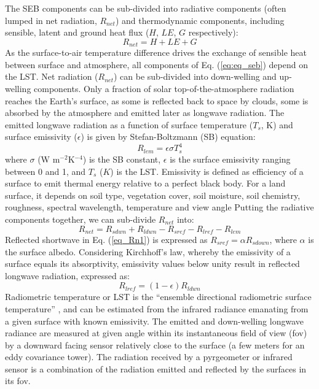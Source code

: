 \documentclass[fleqn,10pt]{wlscirep}
\begin{document}
The SEB components can be sub-divided into radiative components (often lumped in net radiation, $R_{net}$) and thermodynamic components, including sensible, latent and ground heat flux ($H$, $LE$, $G$ respectively):
\begin{equation}\label{eq:eq_seb}
R_{net} = H + LE + G 
\end{equation}
As the surface-to-air temperature difference drives the exchange of sensible heat between surface and atmosphere, all components of Eq. (\ref{eq:eq_seb}) depend on the LST. Net radiation ($R_{net}$) can be sub-divided into down-welling and up-welling components. Only a fraction of solar top-of-the-atmosphere radiation reaches the Earth's surface, as some is reflected back to space by clouds, some is absorbed by the atmosphere and emitted later as longwave radiation. The emitted longwave radiation as a function of surface temperature ($T_s$, K) and surface emissivity ($\epsilon$) is given by Stefan-Boltzmann (SB) equation:
\begin{equation}\label{eq_Rlem}
R_{lem}= \epsilon \sigma T_{s}^{4}
\end{equation}
where $\sigma$ (W m$^{-2}$K$^{-4}$) is the SB constant, $\epsilon$ is the surface emissivity ranging between 0 and 1, and $T_{s}$ ($K$) is the LST.
Emissivity is defined as efficiency of a surface to emit thermal energy relative to a perfect black body. For a land surface, it depends on soil type, vegetation cover, soil moisture, soil chemistry, roughness, spectral wavelength, temperature and view angle\cite{norman1995terminology} 
Putting the radiative components together, we can sub-divide $R_{net}$ into:
\begin{equation}\label{eq_Rn1}
R_{net} = R_{sdwn} + R_{ldwn} - R_{sref} - R_{lref} - R_{lem}
\end{equation}
Reflected shortwave in Eq. ({\ref{eq_Rn1}}) is expressed as $R_{sref} = \alpha R_{sdown}$, where $\alpha$ is the surface albedo. Considering Kirchhoff's law, whereby the emissivity of a surface equals its absorptivity, emissivity values below unity result in reflected longwave radiation, expressed as:
\begin{equation}\label{eq_Rlref}
R_{lref} = (1 - \epsilon) R_{ldwn} 
\end{equation}
Radiometric temperature or LST is the “ensemble directional radiometric surface temperature” \cite{norman1995terminology}, and can be estimated from the infrared radiance emanating from a given surface with known emissivity\cite{kustas2007utility}. The emitted and down-welling longwave radiance are measured at given angle within its instantaneous field of view (fov) by a downward facing sensor relatively close to the surface (a few meters for an eddy covariance tower). The radiation received by a pyrgeometer or infrared sensor is a combination of the radiation emitted and reflected by the surfaces in its fov. 
\end{document}
